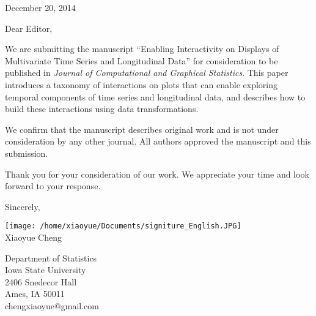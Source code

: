 \documentclass[11pt]{article}
\begin{document}
\begin{flushright}
December 20, 2014
\end{flushright}

Dear Editor,

We are submitting the manuscript ``Enabling Interactivity
on Displays of Multivariate Time Series and Longitudinal Data''
for consideration to be published in \textit{Journal
of Computational and Graphical Statistics}. This paper introduces
a taxonomy of interactions on plots that can enable exploring temporal
components of time series and longitudinal data, and describes how
to build these interactions using data transformations.

We confirm that the manuscript describes original work and is not
under consideration by any other journal. All authors approved the
manuscript and this submission.

Thank you for your consideration of our work. We appreciate your time
and look forward to your response.

\bigskip{}

Sincerely,

\texttt{[image: /home/xiaoyue/Documents/signiture\_English.JPG]}\\
Xiaoyue Cheng

Department of Statistics\\
Iowa State University\\
2406 Snedecor Hall\\
Ames, IA 50011\\
chengxiaoyue@gmail.com
\end{document}
